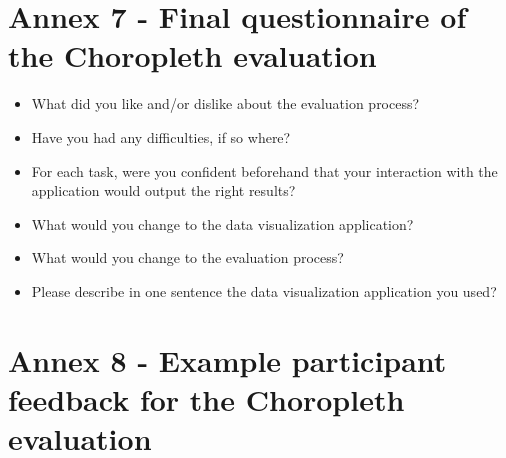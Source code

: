 \documentclass[twocolumn, letterpaper,13pt]{scrartcl}
\begin{document}
    \section*{Annex 7 - Final questionnaire of the Choropleth evaluation} 
    
    \begin{itemize}
        \item What did you like and/or dislike about the evaluation process?
        \item Have you had any difficulties, if so where?
        \item For each task, were you confident beforehand that your interaction with the application would output the right results?
        \item What would you change to the data visualization application?
        \item What would you change to the evaluation process?
        \item Please describe in one sentence the data visualization application you used?
    \end{itemize}
    
    \section*{Annex 8 - Example participant feedback for the Choropleth evaluation} 
    
\end{document}
